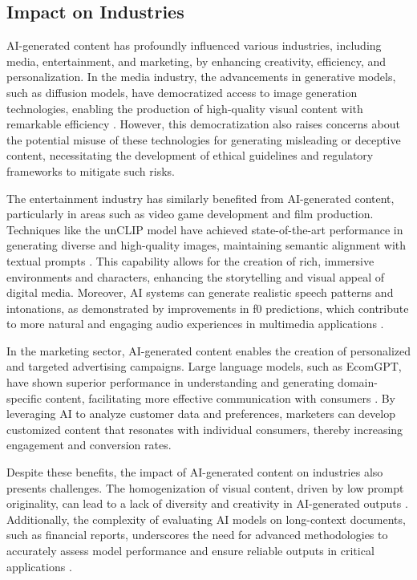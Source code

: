 \subsection{Impact on Industries} \label{subsec:Impact on Industries}



AI-generated content has profoundly influenced various industries, including media, entertainment, and marketing, by enhancing creativity, efficiency, and personalization. In the media industry, the advancements in generative models, such as diffusion models, have democratized access to image generation technologies, enabling the production of high-quality visual content with remarkable efficiency \cite{dhariwal2021diffusion}. However, this democratization also raises concerns about the potential misuse of these technologies for generating misleading or deceptive content, necessitating the development of ethical guidelines and regulatory frameworks to mitigate such risks.



The entertainment industry has similarly benefited from AI-generated content, particularly in areas such as video game development and film production. Techniques like the unCLIP model have achieved state-of-the-art performance in generating diverse and high-quality images, maintaining semantic alignment with textual prompts \cite{Hierarchic4}. This capability allows for the creation of rich, immersive environments and characters, enhancing the storytelling and visual appeal of digital media. Moreover, AI systems can generate realistic speech patterns and intonations, as demonstrated by improvements in f0 predictions, which contribute to more natural and engaging audio experiences in multimedia applications \cite{yuan2018generatingmandarincantonesef0}.



In the marketing sector, AI-generated content enables the creation of personalized and targeted advertising campaigns. Large language models, such as EcomGPT, have shown superior performance in understanding and generating domain-specific content, facilitating more effective communication with consumers \cite{li2023ecomgptinstructiontuninglargelanguage}. By leveraging AI to analyze customer data and preferences, marketers can develop customized content that resonates with individual consumers, thereby increasing engagement and conversion rates.



Despite these benefits, the impact of AI-generated content on industries also presents challenges. The homogenization of visual content, driven by low prompt originality, can lead to a lack of diversity and creativity in AI-generated outputs \cite{palmini2024patternscreativityuserinput}. Additionally, the complexity of evaluating AI models on long-context documents, such as financial reports, underscores the need for advanced methodologies to accurately assess model performance and ensure reliable outputs in critical applications \cite{reddy2024docfinqalongcontextfinancialreasoning}.



